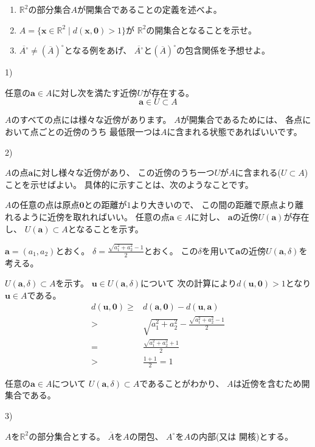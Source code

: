 \documentclass[10pt,b5paper]{ltjsarticle}
\begin{document}
\begin{enumerate}
 \item $\mathbb{R}^2$の部分集合$A$が開集合であることの定義を述べよ。
 \item $A=\{\bm{x}\in\mathbb{R}^2 \mid d(\bm{x},\bm{0}) > 1\}$が
       $\mathbb{R}^2$の開集合となることを示せ。
 \item $\overline{A^\circ}\ne (\overline{A})^\circ$となる例をあげ、
       $\overline{A^\circ}$と$(\overline{A})^\circ$の包含関係を予想せよ。
\end{enumerate}

\dotfill

1)

任意の$\bm{a}\in A$に対し次を満たす近傍$U$が存在する。
\begin{equation}
 \bm{a}\in U \subset A
\end{equation}

$A$のすべての点には様々な近傍があります。
$A$が開集合であるためには、
各点において点ごとの近傍のうち
最低限一つは$A$に含まれる状態であればいいです。


2)

$A$の点$\bm{a}$に対し様々な近傍があり、
この近傍のうち一つ$U$が$A$に含まれる($U\subset A$)ことを示せばよい。
具体的に示すことは、次のようなことです。

$A$の任意の点は原点$\bm{0}$との距離が$1$より大きいので、
この間の距離で原点より離れるように近傍を取れればいい。
任意の点$\bm{a}\in A$に対し、
$\bm{a}$の近傍$U(\bm{a})$が存在し、
$U(\bm{a}) \subset A$となることを示す。

$\bm{a}=(a_1, a_2)$とおく。
$\delta = \frac{\sqrt{a_1^2 + a_2^2} -1}{2}$とおく。
この$\delta$を用いて$\bm{a}$の近傍$U(\bm{a},\delta)$を考える。

$U(\bm{a},\delta) \subset A$を示す。
$\bm{u}\in U(\bm{a},\delta)$について
次の計算により$d(\bm{u},\bm{0})>1$となり$\bm{u}\in A$である。
\begin{align}
 d(\bm{u},\bm{0}) \geq & d(\bm{a},\bm{0}) - d(\bm{u},\bm{a})\\
 > & \sqrt{a_1^2+a_2^2}-\frac{\sqrt{a_1^2 + a_2^2} -1}{2}\\
 = & \frac{\sqrt{a_1^2 + a_2^2} +1}{2}\\
 > & \frac{1+1}{2} =1
\end{align}

任意の$\bm{a}\in A$について $U(\bm{a},\delta) \subset A$であることがわかり、
$A$は近傍を含むため開集合である。


3)

$A$を$\mathbb{R}^2$の部分集合とする。
$\overline{A}$を$A$の閉包、
$A^\circ$を$A$の内部(又は 開核)とする。
\end{document}
